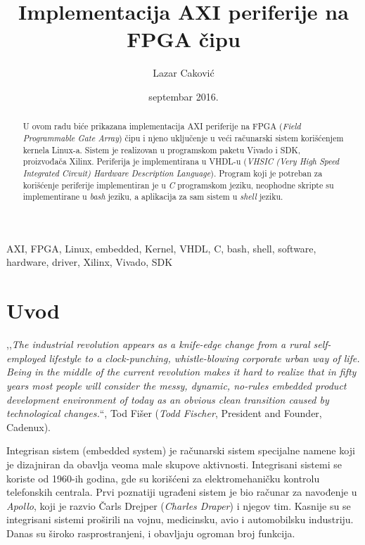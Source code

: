 \documentclass[a4paper, 12pt, diplomski]{etf}
\title{Implementacija AXI periferije na FPGA čipu}
\author{Lazar Caković}
\date{septembar 2016.}
\begin{document}
	\maketitle


	\begin{abstract}

		U ovom radu biće prikazana implementacija AXI periferije na FPGA (\textit{Field Programmable Gate Array}) čipu i njeno uključenje u veći računarski sistem korišćenjem kernela Linux-a. Sistem je realizovan u programskom paketu Vivado i SDK, proizvođača Xilinx. Periferija je implementirana u VHDL-u (\textit{VHSIC (Very High Speed Integrated Circuit) Hardware Description Language}). Program koji je potreban za korišćenje periferije implementiran je u \textit{C} programskom jeziku, neophodne skripte su implementirane u \textit{bash} jeziku, a aplikacija za sam sistem u \textit{shell} jeziku.

	\end{abstract}

	\begin{keywords}

		AXI, FPGA, Linux, embedded, Kernel, VHDL, C, bash, shell, software, hardware, driver, Xilinx, Vivado, SDK

	\end{keywords}

	\tableofcontents

	\listoffigures

	\newpage

	\chapter{Uvod}

		,,\textit{The industrial revolution appears as a knife-edge change from a rural self-employed lifestyle to a clock-punching, whistle-blowing corporate urban way of life. Being in the middle of the current revolution makes it hard to realize that in fifty years most people will consider the messy, dynamic, no-rules embedded product development environment of today as an obvious clean transition caused by technological changes.}``\cite{lit1}, Tod Fišer (\textit{Todd Fischer}, President and Founder, Cadenux).

		Integrisan sistem (embedded system) je računarski sistem specijalne namene koji je dizajniran da obavlja veoma male skupove aktivnosti. Integrisani sistemi se koriste od 1960-ih godina, gde su korišćeni za elektromehaničku kontrolu telefonskih centrala. Prvi poznatiji ugrađeni sistem je bio računar za navođenje u \textit{Apollo}, koji je razvio Čarls Drejper (\textit{Charles Draper}) i njegov tim. Kasnije su se integrisani sistemi proširili na vojnu, medicinsku, avio i automobilsku industriju. Danas su široko rasprostranjeni, i obavljaju ogroman broj funkcija. \cite{lit1}
\end{document}
